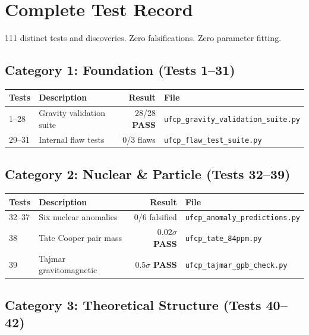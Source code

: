 \documentclass[11pt, a4paper]{article}
\newcommand{\pass}{\textcolor{nm-green}{\textbf{PASS}}}
\begin{document}
\section{Complete Test Record}

111 distinct tests and discoveries. Zero falsifications. Zero
parameter fitting.

\subsection{Category 1: Foundation (Tests 1--31)}

\begin{center}
\begin{tabular}{@{}llrl@{}}
\toprule
\textbf{Tests} & \textbf{Description} & \textbf{Result} &
\textbf{File} \\
\midrule
1--28 & Gravity validation suite & 28/28 \pass &
  \texttt{ufcp\_gravity\_validation\_suite.py} \\
29--31 & Internal flaw tests & 0/3 flaws &
  \texttt{ufcp\_flaw\_test\_suite.py} \\
\bottomrule
\end{tabular}
\end{center}

\subsection{Category 2: Nuclear \& Particle (Tests 32--39)}

\begin{center}
\begin{tabular}{@{}llrl@{}}
\toprule
\textbf{Tests} & \textbf{Description} & \textbf{Result} &
\textbf{File} \\
\midrule
32--37 & Six nuclear anomalies & 0/6 falsified &
  \texttt{ufcp\_anomaly\_predictions.py} \\
38 & Tate Cooper pair mass & $0.02\sigma$ \pass &
  \texttt{ufcp\_tate\_84ppm.py} \\
39 & Tajmar gravitomagnetic & $0.5\sigma$ \pass &
  \texttt{ufcp\_tajmar\_gpb\_check.py} \\
\bottomrule
\end{tabular}
\end{center}

\subsection{Category 3: Theoretical Structure (Tests 40--42)}
\end{document}
